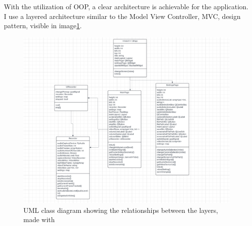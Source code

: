 \par With the utilization of OOP, a clear architecture is achievable for the application. I use a layered architecture similar to the Model View Controller, MVC, design pattern, visible in image\ref{fig:umldiagram}.

\begin{figure}
    \centering
    \includegraphics[width=0.8\linewidth]{figures/UML-Diagram.png}
    \caption{UML class diagram showing the relationships between the layers, made with \cite{lucidchart}}
    \label{fig:umldiagram}
\end{figure}

